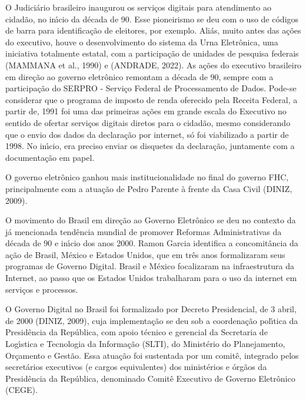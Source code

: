 \documentclass[
12pt,		%
openright,	%
twoside,  %
a4paper,			%
chapter=TITLE,		%
english,			%
french,				%
spanish,			%
brazil				%
]{USPSC-classe/USPSC}
\begin{document}
O Judici\'ario brasileiro inaugurou os servi\c{c}os digitais para atendimento ao cidad\~ao, no in\'{\i}cio da d\'ecada de 90. Esse pioneirismo se deu com o uso de c\'odigos de barra para identifica\c{c}\~ao de eleitores, por exemplo. Ali\'as, muito antes das a\c{c}\~oes do executivo, houve o desenvolvimento do sistema da Urna Eletr\^onica, uma iniciativa totalmente estatal, com a participa\c{c}\~ao de unidades de pesquisa federais (MAMMANA et al., 1990) e (ANDRADE, 2022). As a\c{c}\~oes do executivo brasileiro em dire\c{c}\~ao ao governo eletr\^onico remontam a d\'ecada de 90, sempre com a participa\c{c}\~ao do SERPRO - Servi\c{c}o Federal de Processamento de Dados. Pode-se considerar que o programa de imposto de renda oferecido pela Receita Federal, a partir de, 1991 foi uma das primeiras a\c{c}\~oes em grande escala do Executivo no sentido de ofertar servi\c{c}os digitais diretos para o cidad\~ao, mesmo considerando que o envio dos dados da declara\c{c}\~ao por internet, s\'o foi viabilizado a partir de 1998. No in\'{\i}cio, era preciso enviar os disquetes da declara\c{c}\~ao, juntamente com a documenta\c{c}\~ao em papel.









O governo eletr\^onico ganhou mais institucionalidade no final do governo FHC, principalmente com a atua\c{c}\~ao de Pedro Parente \`a frente da Casa Civil (DINIZ, 2009).









O movimento do Brasil em dire\c{c}\~ao ao Governo Eletr\^onico se deu no contexto da j\'a mencionada tend\^encia mundial de promover Reformas Administrativas da d\'ecada de 90 e in\'{\i}cio dos anos 2000. Ramon Garcia identifica a concomit\^ancia da a\c{c}\~ao de Brasil, M\'exico e Estados Unidos, que em tr\^es anos formalizaram seus programas de Governo Digital. Brasil e M\'exico focalizaram na infraestrutura da Internet, ao passo que os Estados Unidos trabalharam para o uso da internet em servi\c{c}os e processos.









O Governo Digital no Brasil foi formalizado por Decreto Presidencial, de 3 abril, de 2000  (DINIZ, 2009), cuja implementa\c{c}\~ao se deu sob a coordena\c{c}\~ao pol\'{\i}tica da Presid\^encia da Rep\'ublica, com apoio t\'ecnico e gerencial da Secretaria de Log\'{\i}stica e Tecnologia da Informa\c{c}\~ao (SLTI), do Minist\'erio do Planejamento, Or\c{c}amento e Gest\~ao. Essa atua\c{c}\~ao foi sustentada por um comit\^e, integrado pelos secret\'arios executivos (e cargos equivalentes) dos minist\'erios e \'org\~aos da Presid\^encia da Rep\'ublica, denominado Comit\^e Executivo de Governo Eletr\^onico (CEGE).
\end{document}
